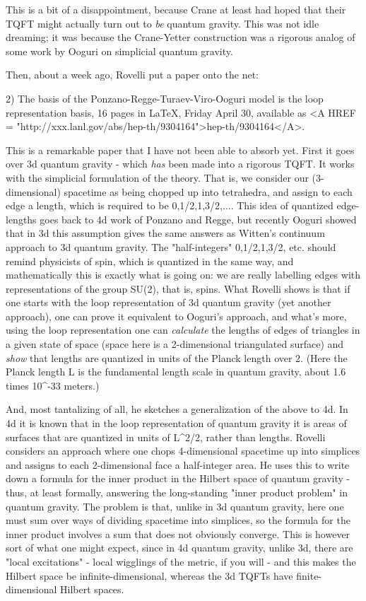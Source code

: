 This is a bit of a disappointment, because Crane at least had hoped that
their TQFT might actually turn out to \emph{be} quantum gravity.  This was
not idle dreaming; it was because the Crane-Yetter construction was a
rigorous analog of some work by Ooguri on simplicial quantum gravity.  


Then, about a week ago, Rovelli put a paper onto the net:

2) The basis of the Ponzano-Regge-Turaev-Viro-Ooguri model is the loop
representation basis, 16 pages in LaTeX, Friday April 30, available as
<A HREF = "http://xxx.lanl.gov/abs/hep-th/9304164">hep-th/9304164</A>. 

This is a remarkable paper that I have not been able to absorb yet.
First it goes over 3d quantum gravity - which \emph{has} been made into a
rigorous TQFT.  It works with the simplicial formulation of the theory.
That is, we consider our (3-dimensional) spacetime as being chopped up
into tetrahedra, and assign to each edge a length, which is required to
be 0,1/2,1,3/2,....  This idea of quantized edge-lengths goes back to
4d work of Ponzano and Regge, but recently Ooguri showed that in 3d
this assumption gives the same answers as Witten's continuum approach to
3d quantum gravity.  The "half-integers" 0,1/2,1,3/2, etc. should remind
physicists of spin, which is quantized in the same way, and
mathematically this is exactly what is going on: we are really labelling
edges with representations of the group SU(2), that is, spins.  What
Rovelli shows is that if one starts with the loop representation of 3d
quantum gravity (yet another approach), one can prove it equivalent to
Ooguri's approach, and what's more, using the loop representation one
can \emph{calculate} the lengths of edges of triangles in a given state of
space (space here is a 2-dimensional triangulated surface) and \emph{show}
that lengths are quantized in units of the Planck length over 2.  (Here
the Planck length L is the fundamental length scale in quantum gravity,
about 1.6 times 10^{-33} meters.)  

And, most tantalizing of all, he sketches a generalization of the above
to 4d.  In 4d it is known that in the loop representation of quantum
gravity it is areas of surfaces that are quantized in units of L^2/2,
rather than lengths.  Rovelli considers an approach where one chops
4-dimensional spacetime up into simplices and assigns to each
2-dimensional face a half-integer area.  He uses this to write down a
formula for the inner product in the Hilbert space of quantum gravity -
thus, at least formally, answering the long-standing "inner product
problem" in quantum gravity.  The problem is that, unlike in 3d quantum
gravity, here one must sum over ways of dividing spacetime into
simplices, so the formula for the inner product involves a sum that does
not obviously converge.  This is however sort of what one might expect,
since in 4d quantum gravity, unlike 3d, there are "local excitations" -
local wigglings of the metric, if you will - and this makes the Hilbert
space be infinite-dimensional, whereas the 3d TQFTs have
finite-dimensional Hilbert spaces.  

